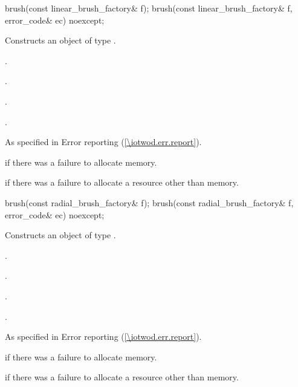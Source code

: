 \begin{itemdecl}
brush(const linear_brush_factory& f);
brush(const linear_brush_factory& f, error_code& ec) noexcept;
\end{itemdecl}
\begin{itemdescr}
\pnum
\effects
Constructs an object of type .

\pnum
\postconditions
{}.

.

.

.

\pnum
\throws
As specified in Error reporting (\ref{\iotwod.err.report}).

\pnum
\errors
{} if there was a failure to allocate memory.

 if there was a failure to allocate a resource other than memory.
\end{itemdescr}

\begin{itemdecl}
brush(const radial_brush_factory& f);
brush(const radial_brush_factory& f, error_code& ec) noexcept;
\end{itemdecl}
\begin{itemdescr}
\pnum
\effects
Constructs an object of type .

\pnum
\postconditions
{}.

.

.

.

\pnum
\throws
As specified in Error reporting (\ref{\iotwod.err.report}).

\pnum
\errors
{} if there was a failure to allocate memory.

 if there was a failure to allocate a resource other than memory.
\end{itemdescr}

